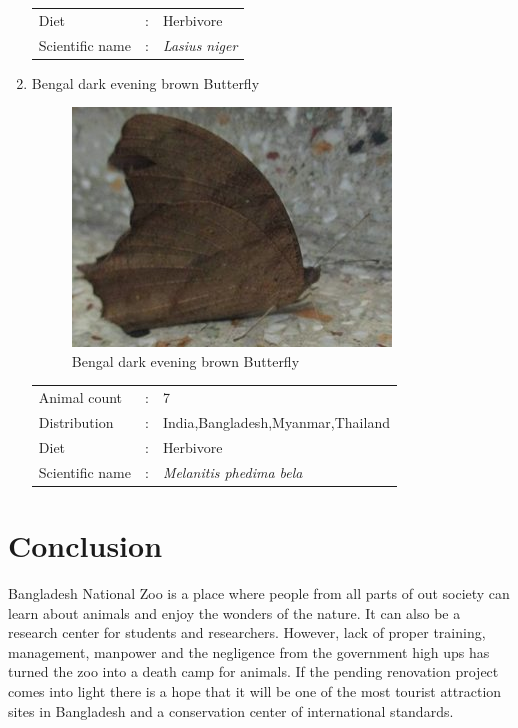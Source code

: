 \documentclass[a4paper, 12pt]{article}
\begin{document}
\begin{enumerate}
\begin{tabular}{lcl}
Diet             &:& Herbivore\\
Scientific name  &:& \textit{Lasius niger}
\end{tabular}
\item Bengal dark evening brown Butterfly\\
\begin{figure}[H]
\centering
\includegraphics[scale=0.7]{Image/brownbutterflies.jpg}
\caption{Bengal dark evening brown Butterfly}
\end{figure}
\begin{tabular}{lcl}
Animal count     &:& 7\\
Distribution     &:& India,Bangladesh,Myanmar,Thailand\\
Diet             &:& Herbivore\\
Scientific name  &:& \textit{Melanitis phedima bela}
\end{tabular}
\end{enumerate}
\newpage
\section{Conclusion}
Bangladesh National Zoo is a place where people from all parts of out society can learn about animals and enjoy the wonders of the nature. It can also be a research center for students and researchers. However, lack of proper training, management, manpower and the negligence from the government high ups has turned the zoo into a death camp for animals. If the pending renovation project comes into light there is a hope that it will be one of the most tourist attraction sites in Bangladesh and a conservation center of international standards.
\end{document}

